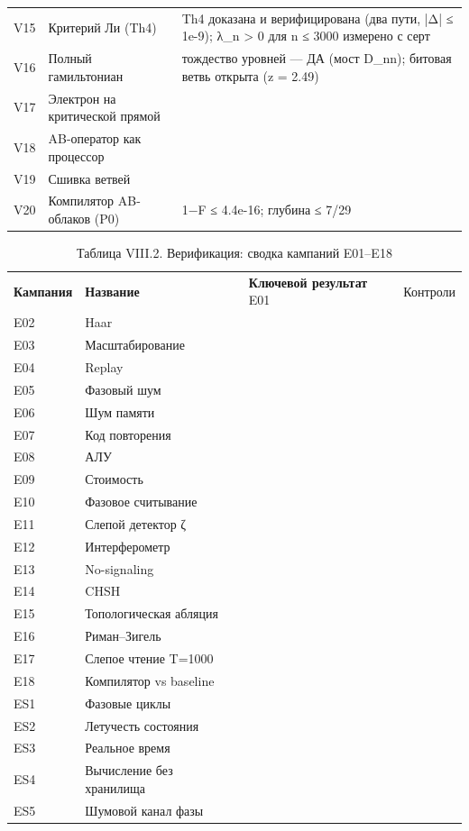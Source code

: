 \documentclass[11pt,a4paper]{article}
\begin{document}
\begin{table}[htbp]
\begin{tabular}{p{} p{} p{}}
V15 & Критерий Ли (Th4) & Th4 доказана и верифицирована (два пути, |Δ| ≤ 1e-9); λ\_n > 0 для n ≤ 3000 измерено с серт \\
V16 & Полный гамильтониан & тождество уровней — ДА (мост D\_nn); битовая ветвь открыта (z = 2.49) \\
V17 & Электрон на критической прямой &  \\
V18 & AB-оператор как процессор &  \\
V19 & Сшивка ветвей &  \\
V20 & Компилятор AB-облаков (P0) & 1−F ≤ 4.4e-16; глубина ≤ 7/29 \\
\bottomrule
\end{tabular}
\end{table}

\begin{table}[htbp]\centering\small
\caption{Таблица VIII.2. Верификация: сводка кампаний E01–E18}
\begin{tabular}{p{} p{} p{}}
\toprule
\textbf{Кампания} & \textbf{Название} & \textbf{Ключевой результат}
\midrule
E01 & Контроли &  \\
E02 & Haar &  \\
E03 & Масштабирование &  \\
E04 & Replay &  \\
E05 & Фазовый шум &  \\
E06 & Шум памяти &  \\
E07 & Код повторения &  \\
E08 & АЛУ &  \\
E09 & Стоимость &  \\
E10 & Фазовое считывание &  \\
E11 & Слепой детектор ζ &  \\
E12 & Интерферометр &  \\
E13 & No-signaling &  \\
E14 & CHSH &  \\
E15 & Топологическая абляция &  \\
E16 & Риман–Зигель &  \\
E17 & Слепое чтение T=1000 &  \\
E18 & Компилятор vs baseline &  \\
ES1 & Фазовые циклы &  \\
ES2 & Летучесть состояния &  \\
ES3 & Реальное время &  \\
ES4 & Вычисление без хранилища &  \\
ES5 & Шумовой канал фазы &  \\
\bottomrule
\end{tabular}
\end{table}
\end{document}
